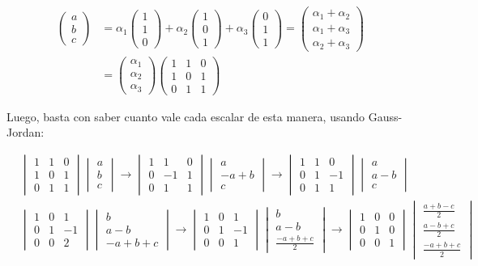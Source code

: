 \documentclass[12pt]{report}                                    %
\newcommand{\pVector}[1]{                                       %
        \ensuremath{\begin{pmatrix}#1\end{pmatrix}}                 %
    }
\newcommand{\lVector}[1]{                                       %
        \ensuremath{\begin{vmatrix}#1\end{vmatrix}}                 %
    }
\begin{document}
            \begin{equation*}
            \begin{split}
                \pVector{a\\b\\c} &=                                                                
                \alpha_1\pVector{1\\1\\0}+\alpha_2\pVector{1\\0\\1}+\alpha_3\pVector{0\\1\\1}       
                = \pVector{\alpha_1+\alpha_2\\\alpha_1+\alpha_3\\\alpha_2+\alpha_3} \\ 
                &= \pVector{\alpha_1\\\alpha_2\\\alpha_3} \pVector{1&1&0\\1&0&1\\0&1&1}
            \end{split}
            \end{equation*}

            Luego, basta con saber cuanto vale cada escalar de esta manera, usando Gauss-Jordan:

            \begin{equation*}
            \begin{split}
                &\lVector{1&1&0\\1&0&1\\0&1&1} \lVector{a\\b\\c} \to
                \lVector{1&1&0\\0&-1&1\\0&1&1} \lVector{a\\-a+b\\c} \to
                \lVector{1&1&0\\0&1&-1\\0&1&1} \lVector{a\\a-b\\c} \\
                &\lVector{1&0&1\\0&1&-1\\0&0&2} \lVector{b\\a-b\\-a+b+c} \to
                \lVector{1&0&1\\0&1&-1\\0&0&1} \lVector{b\\a-b\\ \frac{-a+b+c}{2}} \to
                \lVector{1&0&0\\0&1&0\\0&0&1} \lVector{\frac{a+b-c}{2}\\\frac{a-b+c}{2}\\ \frac{-a+b+c}{2}}
            \end{split}
            \end{equation*}
\end{document}
